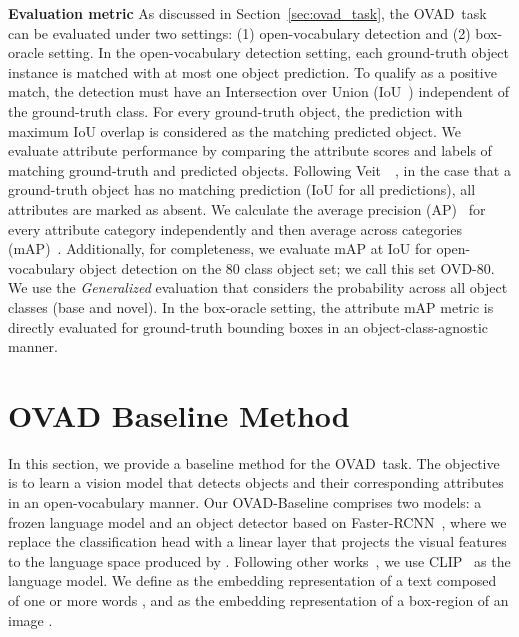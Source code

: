 \documentclass[10pt,twocolumn,letterpaper]{article}
\renewcommand\paragraph[1]{\vspace{0.12cm}\noindent\textbf{#1}}
\newcommand{\modelname}{OVAD-Baseline }
\newcommand{\taskname}{OVAD}
\begin{document}
\paragraph{Evaluation metric} 
As discussed in Section~\ref{sec:ovad_task}, the \taskname\ task can be evaluated under two settings: (1) open-vocabulary detection and (2) box-oracle setting. 
In the open-vocabulary detection setting, each ground-truth object instance is matched with at most one object prediction. To qualify as a positive match, the detection must have an Intersection over Union (IoU~\cite{pascal_voc})  independent of the ground-truth class. 
For every ground-truth object, the prediction with maximum IoU overlap is considered as the matching predicted object. We evaluate attribute performance by comparing the attribute scores and labels of matching ground-truth and predicted objects. 
Following Veit~\etal~\cite{veit2017learning}, in the case that a ground-truth object has no matching prediction (IoU  for all predictions), all attributes are marked as absent.
We calculate the average precision (AP)~\cite{pascal_voc} for every attribute category independently and then average across categories (mAP)~\cite{pascal_voc}.
Additionally, for completeness, we evaluate mAP at  IoU for open-vocabulary object detection on the 80 class object set; we call this set OVD-80. We use the \textit{Generalized} evaluation that considers the probability across all object classes (base and novel). 
In the box-oracle setting, the attribute mAP metric is directly evaluated for ground-truth bounding boxes in an object-class-agnostic manner.  
\section{OVAD Baseline Method}\label{sec:method}
In this section, we provide a baseline method for the \taskname\ task.
The objective is to learn a vision model that detects objects and their corresponding attributes in an open-vocabulary manner.  
Our \modelname comprises two models: a frozen language model  and an object detector  based on Faster-RCNN~\cite{faster_rcnn}, where we replace the classification head with a linear layer that projects the visual features to the language space produced by . Following other works~\cite{detic, vild, regionclip, bridging}, we use CLIP~\cite{clip} as the language model. We define  as the embedding representation of a text composed of one or more words , and  as the embedding representation of a box-region  of an image .\\
\end{document}
